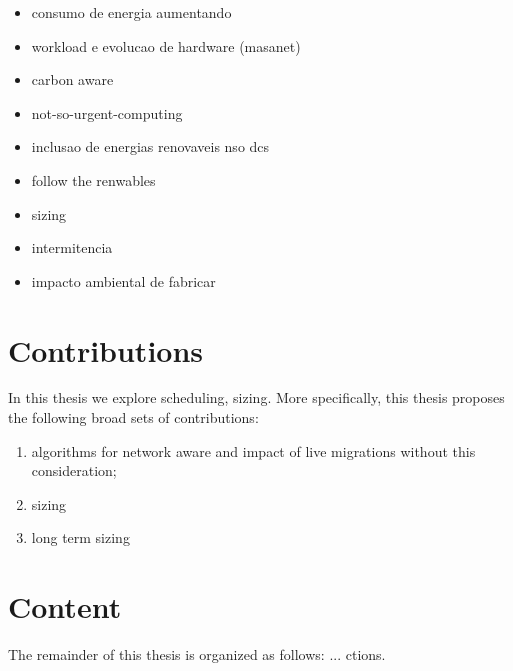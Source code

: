 \begin{itemize}

    \item consumo de energia aumentando    
    \item workload e evolucao de hardware (masanet)
    \item carbon aware
    \item not-so-urgent-computing
    \item inclusao de energias renovaveis nso dcs
   \item follow the renwables
   \item sizing
   \item intermitencia
   \item impacto ambiental de fabricar


\end{itemize}
\section{Contributions}

In this thesis we explore scheduling, sizing. More specifically, this thesis proposes the following broad sets of contributions:

\begin{enumerate}
    \item algorithms for network aware and impact of live migrations without this consideration;
    
    \item sizing
    
    \item long term sizing
    
\end{enumerate}

\section{Content}

The remainder of this thesis is organized as follows: ... ctions.

